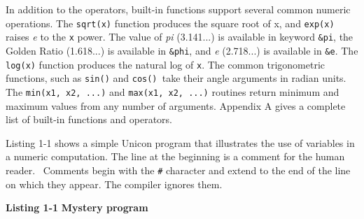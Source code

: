 In addition to the operators, built-in functions support several common
numeric operations. The
\texttt{sqrt(x)} function produces the square root of x,
and \texttt{exp(x)} raises \textit{e} to the \texttt{x}
power. The value of \textit{pi} (3.141...) is
available in keyword \texttt{\&pi}, the Golden Ratio (1.618...) is available in \texttt{\&phi}, and \textit{e} (2.718...) is available in
\texttt{\&e}. The \texttt{log(x)}
function produces the natural log of
\texttt{x}. The common trigonometric
functions, such as \texttt{sin()} and
\texttt{cos()}\texttt{ }take their angle arguments in
radian units. The \texttt{min(x1, x2, ...)}
and \texttt{max(x1, x2, ...)} routines return minimum and
maximum values from any number of arguments. Appendix A gives a
complete list of built-in functions and operators.

Listing 1-1 shows a simple Unicon program that illustrates the use of
variables in a numeric computation. The line at the beginning is a
comment for the human reader. \ Comments begin with the
\texttt{\#} character and extend to the end of the line on which they
appear. The compiler ignores them.

\bigskip

{\sffamily\bfseries Listing 1-1}
{\sffamily\bfseries Mystery program}


